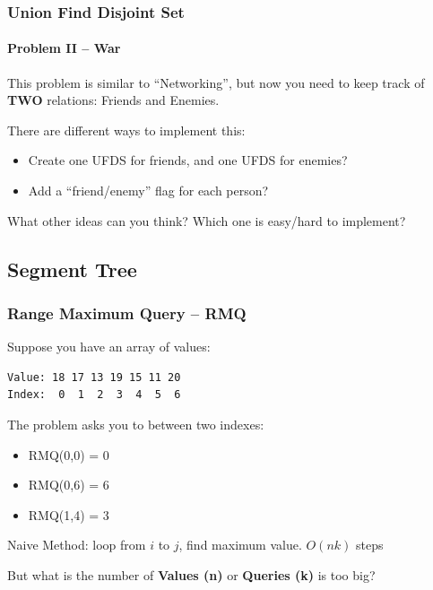 \begin{frame}
  \frametitle{Union Find Disjoint Set}
  \framesubtitle{Problem II -- War}

  This problem is similar to ``Networking'', but now you need to keep track of {\bf TWO} relations: Friends and Enemies.\bigskip

  There are different ways to implement this:
  \begin{itemize}
    \item Create one UFDS for friends, and one UFDS for enemies?
    \item Add a ``friend/enemy'' flag for each person?
  \end{itemize}
  \bigskip

  What other ideas can you think? Which one is easy/hard to implement?
\end{frame}

\subsection{Segment Tree}
\begin{frame}[fragile]
  \frametitle{Range Maximum Query -- RMQ}

  Suppose you have an array of values:
\begin{verbatim}
Value: 18 17 13 19 15 11 20
Index:  0  1  2  3  4  5  6
\end{verbatim}

\bigskip

The  problem asks you to  between two indexes:

\begin{itemize}
  \item RMQ(0,0) = 0
  \item RMQ(0,6) = 6
  \item RMQ(1,4) = 3
\end{itemize}

\bigskip

\alert{Naive Method:} loop from $i$ to $j$, find maximum value. $O(nk)$ steps\\
\medskip

But what is the number of {\bf Values (n)} or {\bf Queries (k)} is too big?
\end{frame}

